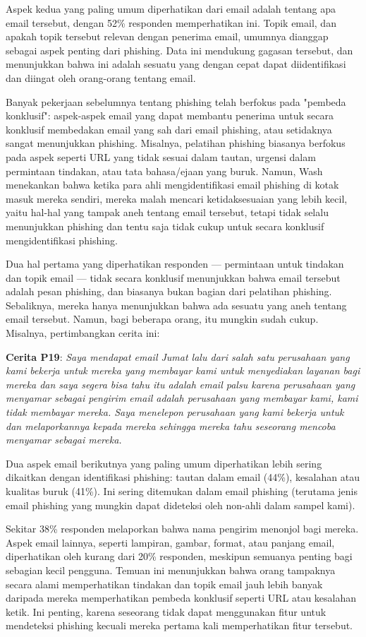 \documentclass[lettersize,journal]{IEEEtran}
\begin{document}
Aspek kedua yang paling umum diperhatikan dari email adalah tentang apa email
tersebut, dengan 52\% responden memperhatikan ini. Topik email, dan apakah
topik tersebut relevan dengan penerima email, umumnya dianggap sebagai aspek
penting dari phishing. Data ini mendukung gagasan tersebut, dan menunjukkan
bahwa ini adalah sesuatu yang dengan cepat dapat diidentifikasi dan diingat
oleh orang-orang tentang email.

Banyak pekerjaan sebelumnya tentang phishing telah berfokus pada "pembeda
konklusif": aspek-aspek email yang dapat membantu penerima untuk secara
konklusif membedakan email yang sah dari email phishing, atau setidaknya sangat
menunjukkan phishing. Misalnya, pelatihan phishing biasanya berfokus pada aspek
seperti URL yang tidak sesuai dalam tautan, urgensi dalam permintaan tindakan,
atau tata bahasa/ejaan yang buruk. Namun, Wash menekankan bahwa ketika para
ahli mengidentifikasi email phishing di kotak masuk mereka sendiri, mereka
malah mencari ketidaksesuaian yang lebih kecil, yaitu hal-hal yang tampak aneh
tentang email tersebut, tetapi tidak selalu menunjukkan phishing dan tentu saja
tidak cukup untuk secara konklusif mengidentifikasi phishing.

Dua hal pertama yang diperhatikan responden — permintaan untuk tindakan dan
topik email — tidak secara konklusif menunjukkan bahwa email tersebut adalah
pesan phishing, dan biasanya bukan bagian dari pelatihan phishing. Sebaliknya,
mereka hanya menunjukkan bahwa ada sesuatu yang aneh tentang email tersebut.
Namun, bagi beberapa orang, itu mungkin sudah cukup. Misalnya, pertimbangkan
cerita ini:

\textbf{Cerita P19}: \textit{Saya mendapat email Jumat lalu dari salah satu perusahaan yang kami bekerja untuk mereka yang membayar kami untuk menyediakan layanan bagi mereka dan saya segera bisa tahu itu adalah email palsu karena perusahaan yang menyamar sebagai pengirim email adalah perusahaan yang membayar kami, kami tidak membayar mereka. Saya menelepon perusahaan yang kami bekerja untuk dan melaporkannya kepada mereka sehingga mereka tahu seseorang mencoba menyamar sebagai mereka.}

Dua aspek email berikutnya yang paling umum diperhatikan lebih sering dikaitkan
dengan identifikasi phishing: tautan dalam email (44\%), kesalahan atau
kualitas buruk (41\%). Ini sering ditemukan dalam email phishing (terutama
jenis email phishing yang mungkin dapat dideteksi oleh non-ahli dalam sampel
kami).

Sekitar 38\% responden melaporkan bahwa nama pengirim menonjol bagi mereka.
Aspek email lainnya, seperti lampiran, gambar, format, atau panjang email,
diperhatikan oleh kurang dari 20\% responden, meskipun semuanya penting bagi
sebagian kecil pengguna. Temuan ini menunjukkan bahwa orang tampaknya secara
alami memperhatikan tindakan dan topik email jauh lebih banyak daripada mereka
memperhatikan pembeda konklusif seperti URL atau kesalahan ketik. Ini penting,
karena seseorang tidak dapat menggunakan fitur untuk mendeteksi phishing
kecuali mereka pertama kali memperhatikan fitur tersebut.
\end{document}
